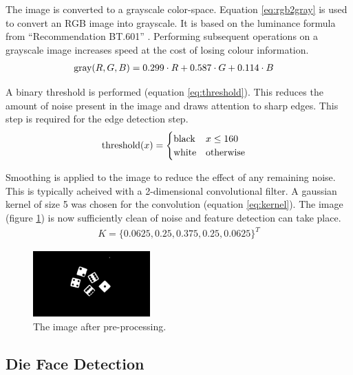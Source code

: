 \documentclass[conference]{IEEEtran}
\begin{document}
The image is converted to a grayscale color-space.
Equation \ref{eq:rgb2gray} is used to convert an RGB image into grayscale.
It is based on the luminance formula from ``Recommendation BT.601'' \cite{R2011}.
Performing subsequent operations on a grayscale image increases speed at the cost of losing colour information.
\begin{align}
	\textnormal{gray}(R, G, B) &= 0.299 \cdot R + 0.587 \cdot G + 0.114 \cdot B \label{eq:rgb2gray}
\end{align}

A binary threshold is performed (equation \ref{eq:threshold}).
This reduces the amount of noise present in the image and draws attention to sharp edges.
This step is required for the edge detection step.
\begin{align}
	\textnormal{threshold}(x) &= \begin{cases}
		\textnormal{black} & x \leq 160 \\
		\textnormal{white} & \textnormal{otherwise}
	\end{cases} \label{eq:threshold}
\end{align}

Smoothing is applied to the image to reduce the effect of any remaining noise.
This is typically acheived with a 2-dimensional convolutional filter.
A gaussian kernel of size 5 was chosen for the convolution (equation \ref{eq:kernel}). 
The image (figure \ref{fig:blurred}) is now sufficiently clean of noise and feature detection can take place.
\begin{align}
	K = \{0.0625, 0.25, 0.375, 0.25, 0.0625\}^T \label{eq:kernel}
\end{align}
\begin{figure}
	\centering
	\includegraphics[width=0.4\textwidth]{blur}
	\caption{The image after pre-processing.}
	\label{fig:blurred}
\end{figure}

\subsection{Die Face Detection}
\end{document}
